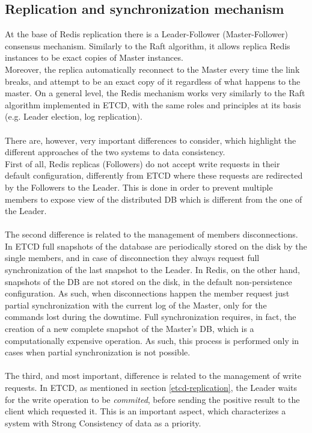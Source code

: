 \pagebreak

\subsection{Replication and synchronization mechanism}
At the base of Redis replication there is a Leader-Follower (Master-Follower) consensus mechanism. Similarly to the Raft algorithm, it allows replica Redis instances to be exact copies of Master instances. \\
Moreover, the replica automatically reconnect to the Master every time the link breaks, and attempt to be an exact copy of it regardless of what happens to the master. On a general level, the Redis mechanism works very similarly to the Raft algorithm implemented in ETCD, with the same roles and principles at its basis (e.g. Leader election, log replication). \\ \\
There are, however, very important differences to consider, which highlight the different approaches of the two systems to data consistency. \\
First of all, Redis replicas (Followers) do not accept write requests in their default configuration, differently from ETCD where these requests are redirected by the Followers to the Leader. This is done in order to prevent multiple members to expose view of the distributed DB which is different from the one of the Leader. \\ \\
The second difference is related to the management of members disconnections. In ETCD full snapshots of the database are periodically stored on the disk by the single members, and in case of disconnection they always request full synchronization of the last snapshot to the Leader. In Redis, on the other hand, snapshots of the DB are not stored on the disk, in the default non-persistence configuration. As such, when disconnections happen the member request just partial synchronization with the current log of the Master, only for the commands lost during the downtime. Full synchronization requires, in fact, the creation of a new complete snapshot of the Master's DB, which is a computationally expensive operation. As such, this process is performed only in cases when partial synchronization is not possible. \\ \\
The third, and most important, difference is related to the management of write requests. In ETCD, as mentioned in section \ref{etcd-replication}, the Leader waits for the write operation to be \textit{commited}, before sending the positive result to the client which requested it. This is an important aspect, which characterizes a system with Strong Consistency of data as a priority. \\
